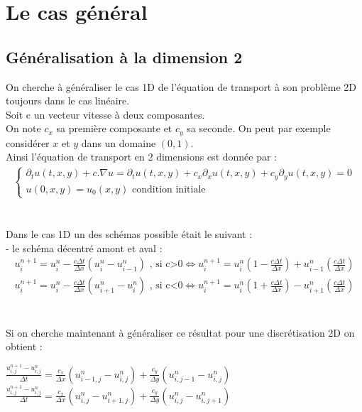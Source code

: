 \documentclass[12pt]{article}
\begin{document}
\section{Le cas général}
\subsection{Généralisation à la dimension 2}
\noindent On cherche à généraliser le cas 1D de l'équation de transport à son problème 2D toujours dans le cas linéaire.
\\ Soit c un vecteur vitesse à deux composantes.
\\On note $c_x$ sa première composante et $c_y$ sa seconde.
On peut par exemple considérer $x$ et $y$ dans un domaine $(0,1)$.
\\Ainsi l'équation de transport en 2 dimensions est donnée par :
\\
\begin{eqnarray*}
      \left\{
        \begin{array}{llll}
            \partial_tu(t,x,y)+c.\nabla u=\partial_tu(t,x,y) +c_x\partial_xu(t,x,y)+c_y\partial_yu(t,x,y)=0
            \\ u(0,x,y)=u_0(x,y) \text{ condition initiale}
        \end{array}
    \right .
\end{eqnarray*}
\\
\\Dans le cas 1D un des schémas possible était le suivant :
\\- le schéma décentré amont et aval :
\begin{eqnarray*}
        u^{n+1}_i=u_i^n-\frac{c\Delta t}{\Delta x}({u_{i}^n-u_{i-1}^n}) \text{       , si c>0}
        \iff u^{n+1}_i=u_i^n\left(1-\frac{c\Delta t}{\Delta x}\right)+u_{i-1}^n\left(\frac{c\Delta t}{\Delta x}\right)	
        \\u^{n+1}_i=u_i^n-\frac{c\Delta t}{\Delta x}({u_{i+1}^n-u_{i}^n}) \text{       , si c<0}
        \iff u^{n+1}_i=u_i^n\left(1+\frac{c\Delta t}{\Delta x}\right)-u_{i+1}^n\left(\frac{c\Delta t}{\Delta x}\right)
\end{eqnarray*}
\\
\\Si on cherche maintenant à généraliser ce résultat pour une discrétisation 2D on obtient :
\\
\begin{center}
         $\displaystyle\frac{u_{i,j}^{n+1}-u_{i,j}^{n}}{\Delta t}=\frac{c_x}{\Delta x}(u_{i-1,j}^n-u_{i,j}^n)+\frac{c_y}{\Delta y}(u_{i,j-1}^n-u_{i,j}^n)$
        \\
        $ \displaystyle\frac{u_{i,j}^{n+1}-u_{i,j}^{n}}{\Delta t}=\frac{c_x}{\Delta x}(u_{i,j}^n-u_{i+1,j}^n)+\frac{c_y}{\Delta y}(u_{i,j}^n-u_{i,j+1}^n)$
\end{center}
\end{document}
